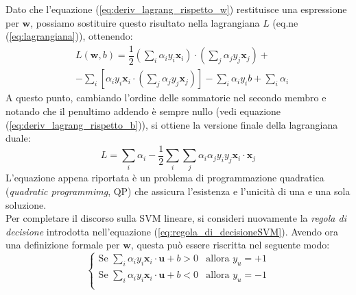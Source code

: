 Dato che l'equazione (\ref{eq:deriv_lagrang_rispetto_w}) restituisce una espressione per $\mathbf{w}$, possiamo sostituire questo risultato nella lagrangiana $L$ (eq.ne (\ref{eq:lagrangiana})), ottenendo:
\begin{eqnarray}\nonumber
\label{eq:lagrangiana_finale1}
&L(\mathbf{w},b)	= \dfrac{1}{2}\left ( \sum_i \alpha_iy_i\mathbf{x}_i \right )\cdot\left (\sum_j\alpha_jy_j\mathbf{x}_j\right )+\\
		&-\sum_i\left [\alpha_iy_i\mathbf{x}_i\cdot\left (\sum_j\alpha_jy_j\mathbf{x}_j\right )\right ]-
		\sum_i\alpha_iy_ib+\sum_i\alpha_i	
\end{eqnarray}
A questo punto, cambiando l'ordine delle sommatorie nel secondo membro e notando che il penultimo addendo è sempre nullo (vedi equazione (\ref{eq:deriv_lagrang_rispetto_b})), si ottiene la versione finale della lagrangiana duale: 
\begin{equation}
\label{eq:langrangiana_finale2}
L=\sum_i\alpha_i-\dfrac{1}{2	}\sum_i\sum_j\alpha_i\alpha_jy_iy_j\mathbf{x}_i\cdot\mathbf{x}_j
\end{equation}
L'equazione appena riportata è un problema di programmazione quadratica (\emph{quadratic programmimg}, QP) che assicura l'esistenza e l'unicità di una e una sola soluzione.\\

Per completare il discorso sulla SVM lineare, si consideri nuovamente la \emph{regola di decisione} introdotta nell'equazione (\ref{eq:regola_di_decisioneSVM}). Avendo ora una definizione formale per $\mathbf{w}$, questa può essere riscritta nel seguente modo:
\begin{equation}
\label{eq:regola_di_decisioneSVM_lineare}
\left\{
		\begin{array}{ll}
			\text{Se } \sum_i\alpha_i y_i\mathbf{x}_i\cdot\mathbf{u}+b>0 & \mbox{allora } y_u=+1 \\
			\text{Se } \sum_i\alpha_i y_i\mathbf{x}_i\cdot\mathbf{u}+b<0 & \mbox{allora } y_u=-1 \\
		\end{array}
	\right.
\end{equation}

